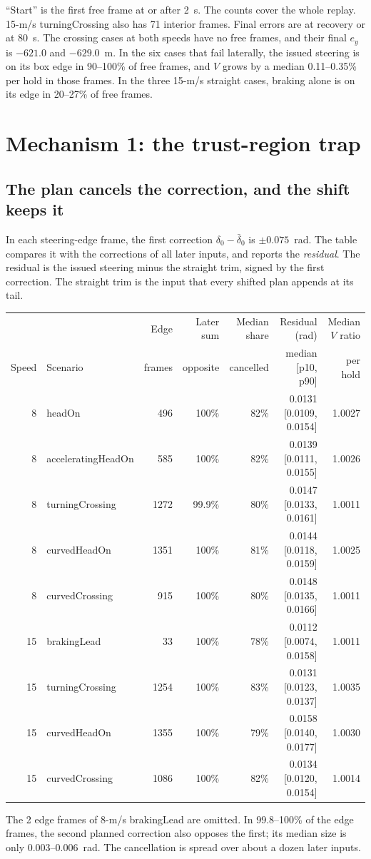 \documentclass[11pt]{article}
\begin{document}
``Start'' is the first free frame at or after 2~s. The counts cover the whole
replay. 15-m/s turningCrossing also has 71 interior frames.
Final errors are at recovery or at 80~s. The crossing cases at both speeds have
no free frames, and their final $e_y$ is $-621.0$ and $-629.0$~m. In the six
cases that fail laterally, the issued steering is on its box edge in 90--100\%
of free frames, and $V$ grows by a median 0.11--0.35\% per hold in those frames.
In the three 15-m/s straight cases, braking alone is on its edge in 20--27\% of
free frames.

\section{Mechanism 1: the trust-region trap}
\subsection{The plan cancels the correction, and the shift keeps it}
In each steering-edge frame, the first correction
$\delta_0-\bar\delta_0$ is $\pm0.075$~rad. The table compares it with the
corrections of all later inputs, and reports the \emph{residual}. The residual
is the issued steering minus the straight trim, signed by the first correction.
The straight trim is the input that every shifted plan appends at its tail.
\begin{center}\footnotesize
\begin{tabular}{rlrrrrr}
\toprule
 & & Edge & Later sum & Median share & Residual (rad) & Median $V$ ratio\\
Speed & Scenario & frames & opposite & cancelled & median [p10, p90] & per hold\\
\midrule
8 & headOn & 496 & 100\% & 82\% & 0.0131 [0.0109, 0.0154] & 1.0027\\
8 & acceleratingHeadOn & 585 & 100\% & 82\% & 0.0139 [0.0111, 0.0155] & 1.0026\\
8 & turningCrossing & 1272 & 99.9\% & 80\% & 0.0147 [0.0133, 0.0161] & 1.0011\\
8 & curvedHeadOn & 1351 & 100\% & 81\% & 0.0144 [0.0118, 0.0159] & 1.0025\\
8 & curvedCrossing & 915 & 100\% & 80\% & 0.0148 [0.0135, 0.0166] & 1.0011\\
15 & brakingLead & 33 & 100\% & 78\% & 0.0112 [0.0074, 0.0158] & 1.0011\\
15 & turningCrossing & 1254 & 100\% & 83\% & 0.0131 [0.0123, 0.0137] & 1.0035\\
15 & curvedHeadOn & 1355 & 100\% & 79\% & 0.0158 [0.0140, 0.0177] & 1.0030\\
15 & curvedCrossing & 1086 & 100\% & 82\% & 0.0134 [0.0120, 0.0154] & 1.0014\\
\bottomrule
\end{tabular}\end{center}
The 2 edge frames of 8-m/s brakingLead are omitted. In 99.8--100\% of the edge
frames, the second planned correction also opposes the first; its median size
is only 0.003--0.006~rad. The cancellation is spread over about a dozen later
inputs.
\end{document}
